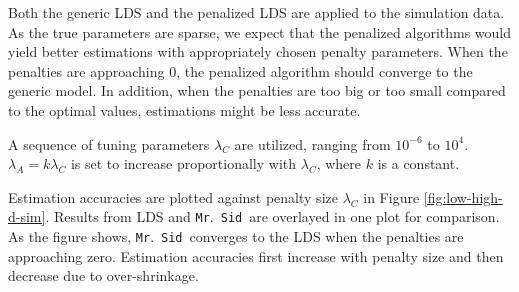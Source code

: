 \documentclass[fleqn,12pt]{article}
\let\oldref\ref
\renewcommand{\ref}[1]{(\oldref{#1})}
\newcommand{\mrsid}{{\sc \texttt{Mr}.~\texttt{Sid}}}
\begin{document}
Both the generic LDS and the penalized LDS are applied to the simulation data. As the true parameters are sparse, we expect that the penalized algorithms would yield better estimations with appropriately chosen penalty parameters. When the penalties are approaching 0, the penalized algorithm should converge to the generic model. In addition, when the penalties are too big or too small compared to the optimal values, estimations might be less accurate.

A sequence of tuning parameters $\lambda_C$ are utilized, ranging from $10^{-6}$ to $10^4$. $\lambda_A = k \lambda_C$ is set to increase proportionally with $\lambda_C$, where $k$ is a constant.

Estimation accuracies are plotted against penalty size $\lambda_C$ in Figure \oldref{fig:low-high-d-sim}. Results from LDS and \mrsid~are overlayed in one plot for comparison. As the figure shows, \mrsid~converges to the LDS when the penalties are approaching zero. Estimation accuracies first increase with penalty size and then decrease due to over-shrinkage.
\end{document}
